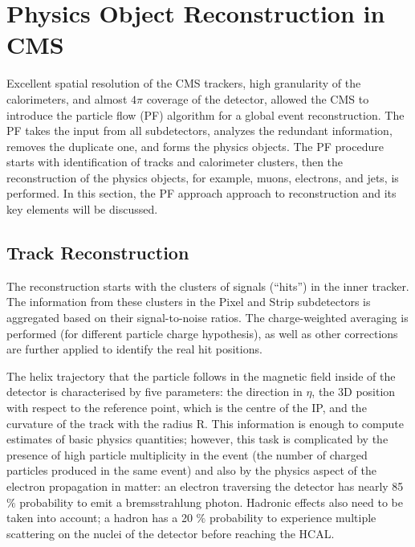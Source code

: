 
\chapter{Physics Object Reconstruction in CMS} \label{sec:cms_reco}

Excellent spatial resolution of the CMS trackers, high granularity of the calorimeters, and almost $4\pi$ coverage of the detector, allowed the CMS to introduce the particle flow (PF) algorithm \cite{Particle_flow} for a global event reconstruction. The PF takes the input from all subdetectors, analyzes the redundant information, removes the duplicate one, and forms the physics objects. The PF procedure starts with identification of tracks and calorimeter clusters, then the reconstruction of the physics objects, for example, muons, electrons, and jets, is performed. In this section, the PF approach approach to reconstruction and its key elements will be discussed.

    
\section{Track Reconstruction}\label{sec:track_reconstruction}

The reconstruction starts with the clusters of signals (``hits'') in the inner tracker. The information from these clusters in the Pixel and Strip subdetectors is aggregated based on their signal-to-noise ratios. The charge-weighted averaging is performed (for different particle charge hypothesis), as well as other corrections are further applied to identify the real hit positions. 

The helix trajectory that the particle follows in the magnetic field inside of the detector is characterised by five parameters: the direction in $\eta$, the 3D position with respect to the reference point, which is the centre of the IP, and the curvature of the track with the radius R. This information is enough to compute estimates of basic physics quantities; however, this task is complicated by the presence of high particle multiplicity in the event (the number of charged particles produced in the same event) and also by the physics aspect of the electron propagation in matter: an electron traversing the detector has nearly 85 $\%$ probability to emit a bremsstrahlung photon. Hadronic effects also need to be taken into account; a hadron has a 20 $\%$ probability to experience multiple scattering on the nuclei of the detector before reaching the HCAL. 

